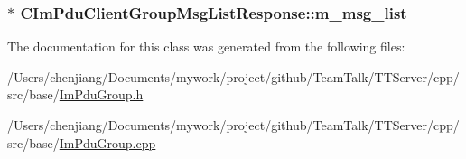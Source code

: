 \subsubsection[{m\+\_\+msg\+\_\+list}]{$\ast$ C\+Im\+Pdu\+Client\+Group\+Msg\+List\+Response\+::m\+\_\+msg\+\_\+list\hspace{0.3cm}{\ttfamily [private]}}\label{class_c_im_pdu_client_group_msg_list_response_a054d85160622932ef67e320236c469f4}


The documentation for this class was generated from the following files\+:\begin{DoxyCompactItemize}
\item 
/\+Users/chenjiang/\+Documents/mywork/project/github/\+Team\+Talk/\+T\+T\+Server/cpp/src/base/\hyperlink{_im_pdu_group_8h}{Im\+Pdu\+Group.\+h}\item 
/\+Users/chenjiang/\+Documents/mywork/project/github/\+Team\+Talk/\+T\+T\+Server/cpp/src/base/\hyperlink{_im_pdu_group_8cpp}{Im\+Pdu\+Group.\+cpp}\end{DoxyCompactItemize}
